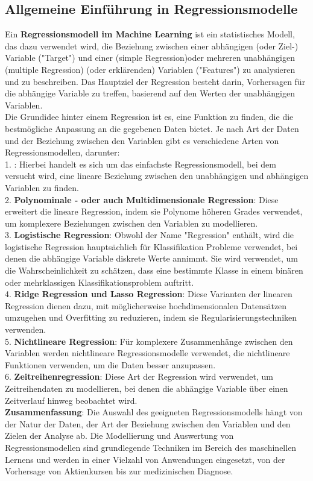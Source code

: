\documentclass[12pt]{article}
\begin{document}
\subsection{Allgemeine Einführung in Regressionsmodelle}

Ein \textbf{Regressionsmodell im Machine Learning} ist ein statistisches Modell, das dazu verwendet wird, die Beziehung zwischen einer abhängigen (oder Ziel-) Variable ("Target") und einer (simple Regression)oder mehreren unabhängigen (multiple Regression) (oder erklärenden) Variablen ("Features") zu analysieren und zu beschreiben. Das Hauptziel der Regression besteht darin, Vorhersagen für die abhängige Variable zu treffen, basierend auf den Werten der unabhängigen Variablen.\\
Die Grundidee hinter einem Regression ist es, eine Funktion zu finden, die die bestmögliche Anpassung an die gegebenen Daten bietet. Je nach Art der Daten und der Beziehung zwischen den Variablen gibt es verschiedene Arten von Regressionsmodellen, darunter:\\[0.2cm] 
% 
1. \textbf{{\color{blue}{Lineare Regression}}}:  Hierbei handelt es sich um das einfachste Regressionsmodell, bei dem versucht wird, eine lineare Beziehung zwischen den unabhängigen und abhängigen Variablen zu finden.\\[0.2cm]
%  
2. \textbf{Polynominale - oder auch Multidimensionale Regression}: Diese erweitert die lineare Regression, indem sie Polynome höheren Grades verwendet, um komplexere Beziehungen zwischen den Variablen zu modellieren.\\[0.2cm]
% 
3. \textbf{Logistische Regression}: Obwohl der Name "Regression" enthält, wird die logistische Regression hauptsächlich für Klassifikation Probleme verwendet, bei denen die abhängige Variable diskrete Werte annimmt. Sie wird verwendet, um die Wahrscheinlichkeit zu schätzen, dass eine bestimmte Klasse in einem binären oder mehrklassigen Klassifikationsproblem auftritt.\\[0.2cm]
%  
4. \textbf{Ridge Regression und Lasso Regression}: Diese Varianten der linearen Regression dienen dazu, mit möglicherweise hochdimensionalen Datensätzen umzugehen und Overfitting zu reduzieren, indem sie Regularisierungstechniken verwenden.\\[0.2cm] 
% 
5. \textbf{Nichtlineare Regression}: Für komplexere Zusammenhänge zwischen den Variablen werden nichtlineare Regressionsmodelle verwendet, die nichtlineare Funktionen verwenden, um die Daten besser anzupassen.\\[0.2cm]
% 
6. \textbf{Zeitreihenregression}: Diese Art der Regression wird verwendet, um Zeitreihendaten zu modellieren, bei denen die abhängige Variable über einen Zeitverlauf hinweg beobachtet wird.\\[0.2cm]
% 
\textbf{Zusammenfassung}: Die Auswahl des geeigneten Regressionsmodells hängt von der Natur der Daten, der Art der Beziehung zwischen den Variablen und den Zielen der Analyse ab. Die Modellierung und Auswertung von Regressionsmodellen sind grundlegende Techniken im Bereich des maschinellen Lernens und werden in einer Vielzahl von Anwendungen eingesetzt, von der Vorhersage von Aktienkursen bis zur medizinischen Diagnose. 
\end{document}
